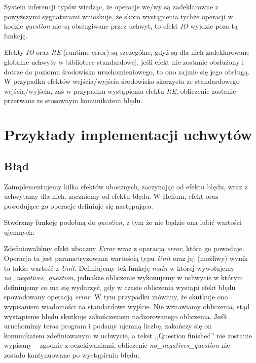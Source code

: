 System inferencji typów wiedząc, że operacje we/wy są zadeklarowne z powyższymi sygnaturami wnioskuje, że skoro wystąpienia tychże operacji w kodzie \textit{question} nie są obsługiwane przez uchwyt, to efekt \textit{IO} wyjdzie poza tą funkcję.

Efekty \textit{IO} oraz \textit{RE} (runtime error) są szczególne, gdyż są dla nich zadeklarowane globalne uchwyty w bibliotece standardowej, jeśli efekt nie zostanie obsłużony i dotrze do poziomu środowiska uruchomieniowego, to ono zajmie się jego obsługą. W przypadku efektów wejścia/wyjścia środowisko skorzysta ze standardowego wejścia/wyjścia, zaś w przypadku wystąpienia efektu \textit{RE}, obliczenie zostanie przerwane ze stosownym komunikatem błędu.

\section{Przykłady implementacji uchwytów}

\subsection{Błąd}

Zaimplementujemy kilka efektów ubocznych, zaczynając od efektu błędu, wraz z uchwytamy dla nich. zaczniemy od efektu błędu. W Helium, efekt oraz powodujące go operacje definiuje się następująco:



Stwórzmy funkcję podobną do \textit{question}, z tym że nie będzie ona lubić wartości ujemnych:



Zdefiniowaliśmy efekt uboczny \textit{Error} wraz z operacją \textit{error}, która go powoduje. Operacja ta jest parametryzowana wartością typu \textit{Unit} oraz jej (możliwy) wynik to także wartość z \textit{Unit}. Definiujemy też funkcję \textit{main} w której wywołujemy \textit{no\_negatives\_question}, jednakże obliczenie wykonujemy w uchwycie w którym definiujemy co ma się wydarzyć, gdy w czasie obliczenia wystąpi efekt błędu spowodowany operacją \textit{error}. W tym przypadku mówimy, że skutkuje ono wypisaniem wiadomości na standardowe wyjście. Nie wznawiamy obliczenia, stąd wystąpienie błędu skutkuje zakończeniem nadzorowanego obliczenia. Jeśli uruchomimy teraz program i podamy ujemną liczbę, zakończy się on komunikatem zdefiniowanym w uchwycie, a tekst ,,Question finished'' nie zostanie wypisany -- zgodnie z oczekiwaniami, obliczenie \textit{no\_negatives\_question} nie zostało kontynuowane po wystąpieniu błędu.

